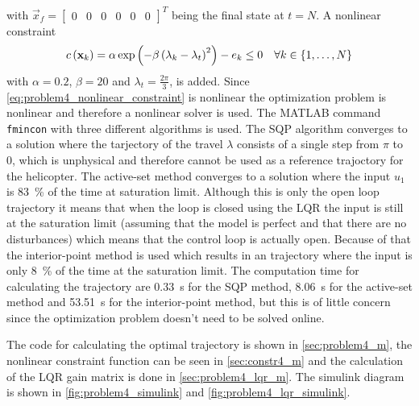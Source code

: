 with $\vec{x}_f=\begin{bmatrix} 0 & 0 & 0 & 0 & 0 & 0\end{bmatrix}^T$ being the final state at $t=N$. A nonlinear constraint 
\begin{equation}
c\left(\mathbf{x}_k\right)=\alpha \exp\left(-\beta\left(\lambda_k-\lambda_t\right)^2\right)-e_k\leq0 \quad \forall k\in\{1,\ldots,N\}
\label{eq:problem4_nonlinear_constraint}
\end{equation}
with $\alpha=0.2$, $\beta=20$ and $\lambda_t=\frac{2\pi}{3}$, is added. Since \eqref{eq:problem4_nonlinear_constraint} is nonlinear the optimization problem is nonlinear and therefore a nonlinear solver is used. The MATLAB command \verb|fmincon| with three different algorithms is used. The SQP algorithm converges to a solution where the tarjectory of the travel $\lambda$ consists of a single step from $\pi$ to 0, which is unphysical and therefore cannot be used as a reference trajoctory for the helicopter. The active-set method converges to a solution where the input $u_1$ is \SI{83}{\percent} of the time at saturation limit. Although this is only the open loop trajectory it means that when the loop is closed using the LQR the input is still at the saturation limit (assuming that the model is perfect and that there are no disturbances) which means that the control loop is actually open. Because of that the interior-point method is used which results in an trajectory where the input is only \SI{8}{\percent} of the time at the saturation limit. The computation time for calculating the trajectory are \SI{0.33}{\second} for the SQP method, \SI{8.06}{\second} for the active-set method and \SI{53.51}{\second} for the interior-point method, but this is of little concern since the optimization problem doesn't need to be solved online.

The code for calculating the optimal trajectory is shown in \cref{sec:problem4_m}, the nonlinear constraint function can be seen in \cref{sec:constr4_m} and the calculation of the LQR gain matrix is done in \cref{sec:problem4_lqr_m}. The simulink diagram is shown in \cref{fig:problem4_simulink} and \cref{fig:problem4_lqr_simulink}.


